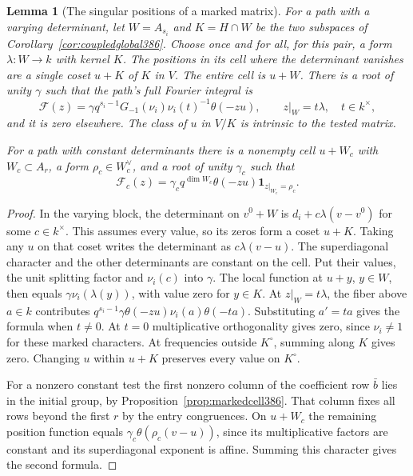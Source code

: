 \documentclass[a4paper,11pt]{article}
\newtheorem{lemma}[proposition]{Lemma}
\theoremstyle{definition}
\theoremstyle{remark}
\numberwithin{equation}{section}
\begin{document}
\begin{lemma}[The singular positions of a marked matrix]
\label{lem:markedsingular387}
For a path with a varying determinant, let \(W=A_{s_i}\) and
\(K=H\cap W\) be the two subspaces of
Corollary~\ref{cor:coupledglobal386}. Choose once and for all,
for this pair, a form \(\lambda:W\to k\) with kernel \(K\).
The positions in its cell where the determinant vanishes are a
single coset \(u+K\) of \(K\) in \(V\). The entire cell is \(u+W\).
There is a root of unity \(\gamma\) such that the path's full
Fourier integral is
\[
  \mathcal F(z)=
   \gamma q^{s_i-1}G_{-1}(\nu_i)\nu_i(t)^{-1}\theta(-zu),
   \qquad z|_W=t\lambda,\quad t\in k^\times ,
\]
and it is zero elsewhere. The class of \(u\) in \(V/K\) is
intrinsic to the tested matrix.

For a path with constant determinants there is a nonempty cell
\(u+W_c\) with \(W_c\subset A_r\), a form
\(\rho_c\in W_c^\vee\), and a root of unity \(\gamma_c\) such that
\[
  \mathcal F_c(z)=
    \gamma_c q^{\dim W_c}\theta(-zu)
               \mathbf1_{z|_{W_c}=\rho_c}.
\]
\end{lemma}
\begin{proof}
In the varying block, the determinant on \(v^0+W\) is
\(d_i+c\lambda(v-v^0)\) for some \(c\in k^\times\).
This assumes every value, so its zeros form a coset \(u+K\).
Taking any \(u\) on that coset writes the determinant as
\(c\lambda(v-u)\). The superdiagonal character and the
other determinants are constant on the cell. Put their values,
the unit splitting factor and \(\nu_i(c)\) into \(\gamma\).
The local function at \(u+y\), \(y\in W\), then equals
\(\gamma\nu_i(\lambda(y))\), with value zero for \(y\in K\).
At \(z|_W=t\lambda\), the fiber above \(a\in k\)
contributes \(q^{s_i-1}\gamma\theta(-zu)\nu_i(a)\theta(-ta)\).
Substituting \(a'=ta\) gives the formula when \(t\ne0\).
At \(t=0\) multiplicative orthogonality gives zero, since
\(\nu_i\ne1\) for these marked characters. At frequencies
outside \(K^\circ\), summing along \(K\) gives zero. Changing
\(u\) within \(u+K\) preserves every value on \(K^\circ\).

For a nonzero constant test the first nonzero column of the
coefficient row \(\bar b\) lies in the initial group, by
Proposition~\ref{prop:markedcell386}. That column fixes all rows
beyond the first \(r\) by the entry congruences. On \(u+W_c\)
the remaining position function equals
\(\gamma_c\theta(\rho_c(v-u))\), since its multiplicative
factors are constant and its superdiagonal exponent is affine.
Summing this character gives the second formula.
\end{proof}
\end{document}
